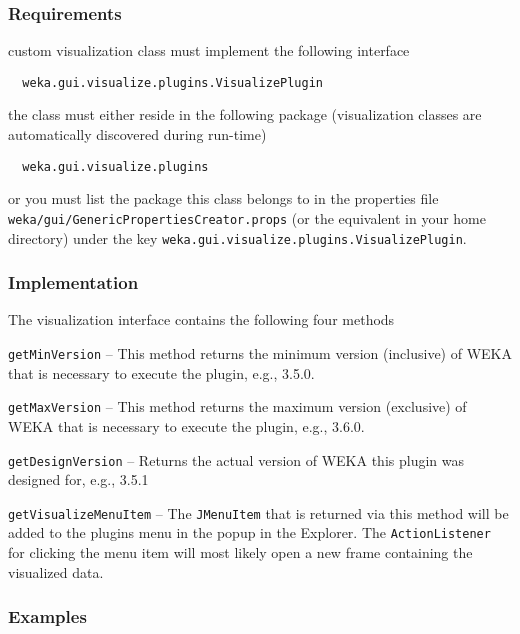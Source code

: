 \subsubsection*{Requirements}
\begin{tight_itemize}
  \item custom visualization class must implement the following interface
  \begin{verbatim}
  weka.gui.visualize.plugins.VisualizePlugin
  \end{verbatim}
  
  \item the class must either reside in the following package (visualization
classes are automatically discovered during run-time)
  \begin{verbatim}
  weka.gui.visualize.plugins
  \end{verbatim}
  
  \item or you must list the package this class belongs to in the properties
file \texttt{weka/gui/GenericPropertiesCreator.props} (or the equivalent in
your home directory) under the key
\texttt{weka.gui.visualize.plugins.VisualizePlugin}.
\end{tight_itemize}

\subsubsection*{Implementation}
The visualization interface contains the following four methods
\begin{tight_itemize}
  \item \texttt{getMinVersion} -- This method returns the minimum version
(inclusive) of WEKA that is necessary to execute the plugin, e.g., 3.5.0.
  \item \texttt{getMaxVersion} -- This method returns the maximum version
(exclusive) of WEKA that is necessary to execute the plugin, e.g., 3.6.0.
  \item \texttt{getDesignVersion} -- Returns the actual version of WEKA
this plugin was designed for, e.g., 3.5.1
  \item \texttt{getVisualizeMenuItem} -- The \texttt{JMenuItem} that is returned
via this method will be added to the plugins menu in the popup in the Explorer.
The \texttt{ActionListener} for clicking the menu item will most likely open a
new frame containing the visualized data.
\end{tight_itemize}

\newpage
\subsubsection*{Examples}
